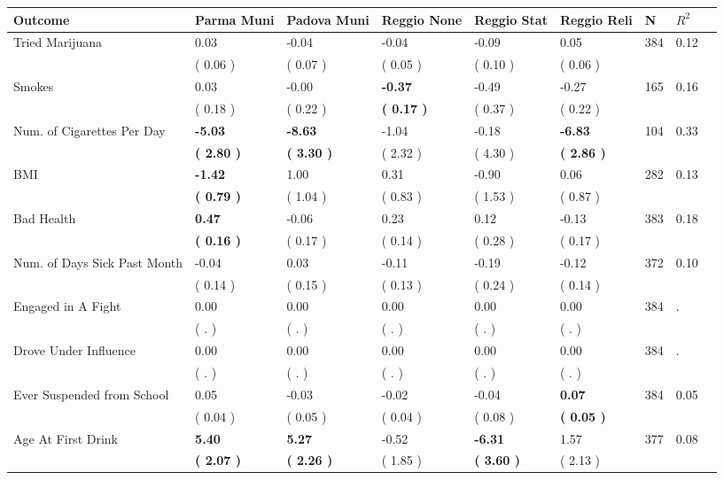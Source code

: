 \begin{tabular}{L{6.2cm} C{1.8cm} C{1.8cm} C{1.8cm} C{1.8cm} C{1.8cm} C{1.8cm} C{0.3cm} C{0.3cm}}
\toprule
 \textbf{Outcome} & \textbf{Parma Muni} & \textbf{Padova Muni} & \textbf{Reggio None} & \textbf{Reggio Stat} & \textbf{Reggio Reli} & \textbf{N} & \textbf{$ R^2$} \\
\midrule
Tried Marijuana &      0.03 &     -0.04 &     -0.04 &     -0.09 &      0.05  & 384 &       0.12 \\ 
 & (     0.06 ) & (     0.07 ) & (     0.05 ) & (     0.10 ) & (     0.06 )  & \\
Smokes &      0.03 &     -0.00 & \textbf{    -0.37} &     -0.49 &     -0.27  & 165 &       0.16 \\ 
 & (     0.18 ) & (     0.22 ) & \textbf{(     0.17 )} & (     0.37 ) & (     0.22 )  & \\
Num. of Cigarettes Per Day & \textbf{    -5.03} & \textbf{    -8.63} &     -1.04 &     -0.18 & \textbf{    -6.83}  & 104 &       0.33 \\ 
 & \textbf{(     2.80 )} & \textbf{(     3.30 )} & (     2.32 ) & (     4.30 ) & \textbf{(     2.86 )}  & \\
BMI & \textbf{    -1.42} &      1.00 &      0.31 &     -0.90 &      0.06  & 282 &       0.13 \\ 
 & \textbf{(     0.79 )} & (     1.04 ) & (     0.83 ) & (     1.53 ) & (     0.87 )  & \\
Bad Health & \textbf{     0.47} &     -0.06 &      0.23 &      0.12 &     -0.13  & 383 &       0.18 \\ 
 & \textbf{(     0.16 )} & (     0.17 ) & (     0.14 ) & (     0.28 ) & (     0.17 )  & \\
Num. of Days Sick Past Month &     -0.04 &      0.03 &     -0.11 &     -0.19 &     -0.12  & 372 &       0.10 \\ 
 & (     0.14 ) & (     0.15 ) & (     0.13 ) & (     0.24 ) & (     0.14 )  & \\
Engaged in A Fight &      0.00 &      0.00 &      0.00 &      0.00 &      0.00  & 384 &          . \\ 
 & (        . ) & (        . ) & (        . ) & (        . ) & (        . )  & \\
Drove Under Influence &      0.00 &      0.00 &      0.00 &      0.00 &      0.00  & 384 &          . \\ 
 & (        . ) & (        . ) & (        . ) & (        . ) & (        . )  & \\
Ever Suspended from School &      0.05 &     -0.03 &     -0.02 &     -0.04 & \textbf{     0.07}  & 384 &       0.05 \\ 
 & (     0.04 ) & (     0.05 ) & (     0.04 ) & (     0.08 ) & \textbf{(     0.05 )}  & \\
Age At First Drink & \textbf{     5.40} & \textbf{     5.27} &     -0.52 & \textbf{    -6.31} &      1.57  & 377 &       0.08 \\ 
 & \textbf{(     2.07 )} & \textbf{(     2.26 )} & (     1.85 ) & \textbf{(     3.60 )} & (     2.13 )  & \\
\bottomrule
\end{tabular}
